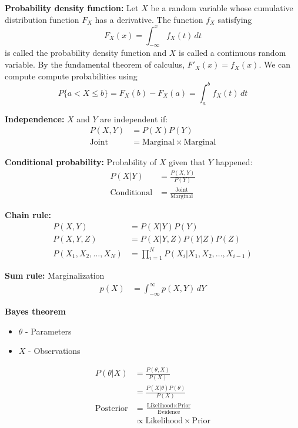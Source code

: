 \documentclass{book}
\begin{document}
\noindent
\textbf{Probability density function:} Let $X$ be  a  random  variable  whose  cumulative distribution function $F_X$ has a derivative. The  function $f_X$ satisfying
\[ F_X(x) = \int _{-\infty }^{x}f_{X}(t)\,dt \]
is called the probability density function and $X$ is called a continuous random variable.
By the fundamental theorem of calculus, ${F}'_X(x) = f_X(x)$. We can compute compute probabilities using
\[P\{a < X \leq b\} = F_X(b) - F_X(a) = \int _{a}^{b}f_{X}(t)\,dt\] 

\noindent
\textbf{Independence:} $X$ and $Y$ are independent if:
\begin{align*}
P(X,Y) &= P(X)P(Y) \\
\text{Joint} &= \text{Marginal} \times \text{Marginal}
\end{align*}

\noindent
\textbf{Conditional probability:} Probability of $X$ given that $Y$ happened:
\begin{align*}
P(X \vert Y) &= \frac{P(X,Y)}{P(Y)} \\
\text{Conditional} &= \frac{\text{Joint}}{\text{Marginal}}
\end{align*}

\noindent
\textbf{Chain rule:} 
\begin{align*}
P(X,Y) &= P(X \vert Y)P(Y) \\
P(X, Y, Z) &= P(X \vert Y, Z) P(Y \vert Z) P(Z) \\
P(X_1,X_2,\dots,X_N) &= \prod_{i=1}^{N}P(X_i \vert X_1,X_2,\dots,X_{i-1})
\end{align*}

\noindent
\textbf{Sum rule:} Marginalization
\begin{align*}
p(X) &= \int _{-\infty }^{\infty} p(X,Y) \, dY
\end{align*} 

\noindent
\textbf{Bayes theorem}
\begin{itemize}
\item $\theta$ - Parameters
\item $X$ - Observations
\end{itemize}
\begin{align*} 
P(\theta \vert X) &= \frac{P(\theta, X)}{P(X)} \\
&= \frac{P(X \vert \theta)P(\theta)}{P(X)} \\
\text{Posterior} &= \frac{\text{Likelihood} \times \text{Prior}}{\text{Evidence}} \\
& \propto \text{Likelihood} \times \text{Prior}
\end{align*}
\end{document}
